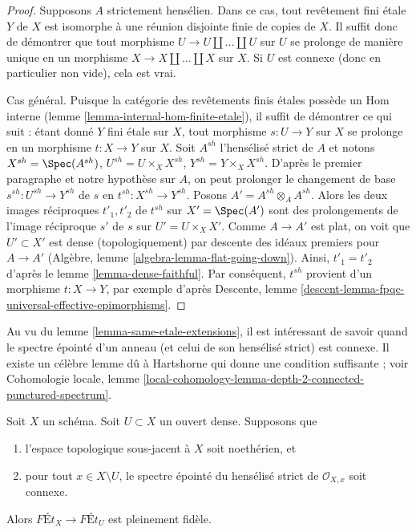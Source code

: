 \begin{proof}
Supposons $A$ strictement hensélien. Dans ce cas, tout revêtement fini étale
$Y$ de $X$ est isomorphe à une réunion disjointe finie de
copies de $X$. Il suffit donc de démontrer que tout morphisme
$U \to U \amalg \ldots \amalg U$ sur $U$ se prolonge de manière unique en un morphisme
$X \to X \amalg \ldots \amalg X$ sur $X$.
Si $U$ est connexe (donc en particulier non vide), cela est vrai.

\medskip\noindent
Cas général. Puisque la catégorie des revêtements finis étales possède un
Hom interne (lemme \ref{lemma-internal-hom-finite-etale}),
il suffit de démontrer ce qui suit : étant donné $Y$ fini étale sur $X$,
tout morphisme $s : U \to Y$ sur $X$ se prolonge en un morphisme $t : X \to Y$
sur $X$. Soit $A^{sh}$ l'hensélisé strict de $A$ et notons
$X^{sh} = \Spec(A^{sh})$, $U^{sh} = U \times_X X^{sh}$,
$Y^{sh} = Y \times_X X^{sh}$. D'après le premier paragraphe et notre hypothèse
sur $A$, on peut prolonger le changement de base $s^{sh} : U^{sh} \to Y^{sh}$ de $s$ en
$t^{sh} : X^{sh} \to Y^{sh}$. Posons $A' = A^{sh} \otimes_A A^{sh}$.
Alors les deux images réciproques $t'_1, t'_2$ de $t^{sh}$ sur $X' = \Spec(A')$
sont des prolongements de l'image réciproque $s'$ de $s$ sur $U' = U \times_X X'$.
Comme $A \to A'$ est plat, on voit que $U' \subset X'$ est dense (topologiquement)
par descente des idéaux premiers pour $A \to A'$
(Algèbre, lemme \ref{algebra-lemma-flat-going-down}). Ainsi,
$t'_1 = t'_2$ d'après le lemme \ref{lemma-dense-faithful}.
Par conséquent, $t^{sh}$ provient d'un morphisme $t : X \to Y$,
par exemple d'après
Descente, lemme \ref{descent-lemma-fpqc-universal-effective-epimorphisms}.
\end{proof}

\noindent
Au vu du lemme \ref{lemma-same-etale-extensions},
il est intéressant de savoir quand le
spectre épointé d'un anneau (et celui de son hensélisé strict)
est connexe. Il existe un célèbre lemme dû à Hartshorne
qui donne une condition suffisante ; voir
Cohomologie locale, lemme
\ref{local-cohomology-lemma-depth-2-connected-punctured-spectrum}.

\begin{lemma}
\label{lemma-quasi-compact-dense-open-connected-at-infinity-Noetherian}
Soit $X$ un schéma. Soit $U \subset X$ un ouvert dense. Supposons que
\begin{enumerate}
\item l'espace topologique sous-jacent à $X$ soit noethérien, et
\item pour tout $x \in X \setminus U$, le spectre épointé du
hensélisé strict de $\mathcal{O}_{X, x}$ soit connexe.
\end{enumerate}
Alors $\textit{F\'Et}_X \to \textit{F\'Et}_U$ est pleinement fidèle.
\end{lemma}

